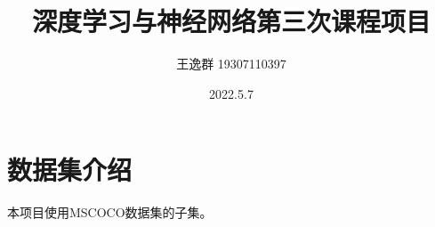\documentclass[12pt]{article}
\title{深度学习与神经网络第三次课程项目}
\author{王逸群 19307110397}
\date{2022.5.7}
\begin{document}
\maketitle

\section{数据集介绍}

本项目使用MSCOCO数据集的子集。
\end{document}
